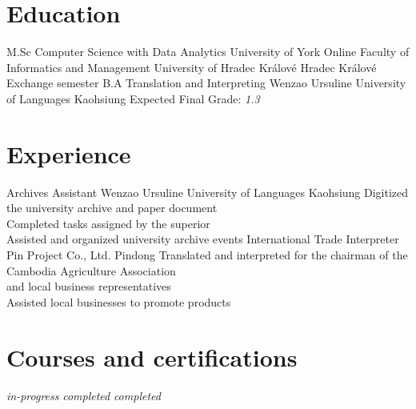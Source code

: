 \documentclass[10pt,a4paper,sans]{moderncv}
\begin{document}
\makecvtitle

\section{Education}
		{M.Sc Computer Science with Data Analytics}
		{University of York}
		{Online}
		{}
		{}
		{Faculty of Informatics and Management}
		{University of Hradec Králové}
		{Hradec Králové}
		{Exchange semester}
		{}
        {B.A Translation and Interpreting}
        {Wenzao Ursuline University of Languages}
        {Kaohsiung}
        {}
        {Expected Final Grade: \emph{1.3}}

\section{Experience}
        {Archives Assistant}
        {Wenzao Ursuline University of Languages}
        {Kaohsiung}
        {}
        {Digitized the university archive and paper document\\
        	Completed tasks assigned by the superior\\
        	Assisted and organized university archive events}
        {International Trade Interpreter}
        {Pin Project Co., Ltd.}
        {Pindong}
        {}
        {Translated and interpreted for the chairman of the Cambodia Agriculture Association\\
        	and local business representatives\\
        	Assisted local businesses to promote products}


\section{Courses and certifications}
				          {\textit{in-progress}}
                  {}
                  {}
				          {}
                  {}
                  {}
				          {}
				          {}
				          {\textit{completed}}
                  {}
				          {\textit{completed}}
                  {}
\end{document}
